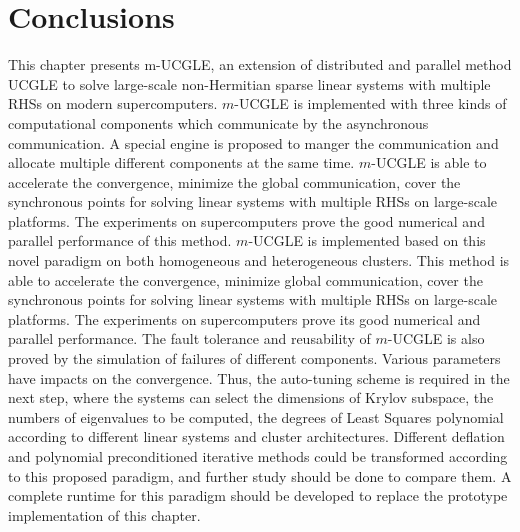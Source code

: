 \section{Conclusions}

This chapter presents m-UCGLE, an extension of distributed and parallel method UCGLE to solve large-scale non-Hermitian sparse linear systems with multiple RHSs on modern supercomputers. $m$-UCGLE is implemented with three kinds of computational components which communicate by the asynchronous communication. A special engine is proposed to manger the communication and allocate multiple different components at the same time. $m$-UCGLE is able to accelerate the convergence, minimize the global communication, cover the synchronous points for solving linear systems with multiple RHSs on large-scale platforms. The experiments on supercomputers prove the good numerical and parallel performance of this method. $m$-UCGLE is implemented based on this novel paradigm on both homogeneous and heterogeneous clusters. This method is able to accelerate the convergence, minimize global communication, cover the synchronous points for solving linear systems with multiple RHSs on large-scale platforms. The experiments on supercomputers prove its good numerical and parallel performance. The fault tolerance and reusability of $m$-UCGLE is also proved by the simulation of failures of different components. Various parameters have impacts on the convergence. Thus, the auto-tuning scheme is required in the next step, where the systems can select the dimensions of Krylov subspace, the numbers of eigenvalues to be computed, the degrees of Least Squares polynomial according to different linear systems and cluster architectures. Different deflation and polynomial preconditioned iterative methods could be transformed according to this proposed paradigm, and further study should be done to compare them. A complete runtime for this paradigm should be developed to replace the prototype implementation of this chapter.

\clearemptydoublepage